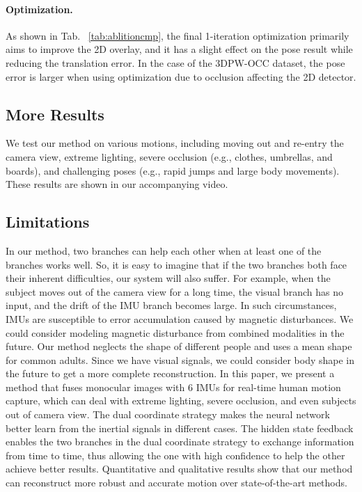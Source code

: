 \documentclass[sigconf,nonacm=true]{acmart}
\newcommand{\hl}[1]{{#1}}
\begin{document}
\paragraph{Optimization.}
As shown in Tab. ~\ref{tab:ablitioncmp}, the final 1-iteration optimization primarily aims to improve the 2D overlay, and it has a slight effect on the pose result while reducing the translation error.
\hl{In the case of the 3DPW-OCC dataset, the pose error is larger when using optimization due to occlusion affecting the 2D detector.}
\subsection{More Results}\label{sec:moreResults}
We test our method on various motions, including moving out and re-entry the camera view, extreme lighting, severe occlusion (e.g., clothes, umbrellas, and boards), and challenging poses (e.g., rapid jumps and large body movements). These results are shown in our accompanying video.

\subsection{Limitations}\label{sec:limitations}
In our method, two branches can help each other when at least one of the branches works well.
So, it is easy to imagine that if the two branches both face their inherent difficulties, our system will also suffer.
For example, when the subject moves out of the camera view for a long time, the visual branch has no input, and the drift of the IMU branch becomes large.
In such circumstances, IMUs are susceptible to error accumulation caused by magnetic disturbances.
We could consider modeling magnetic disturbance from combined modalities in the future.
Our method neglects the shape of different people and uses a mean shape for common adults.
Since we have visual signals, we could consider body shape in the future to get a more complete reconstruction.
In this paper, we present a method that fuses monocular images with 6 IMUs for real-time human motion capture, which can deal with extreme lighting, severe occlusion, and even subjects out of camera view.
The dual coordinate strategy makes the neural network better learn from the inertial signals in different cases.
The hidden state feedback enables the two branches in the dual coordinate strategy to exchange information from time to time, thus allowing the one with high confidence to help the other achieve better results. 
Quantitative and qualitative results show that our method can reconstruct more robust and accurate motion over state-of-the-art methods.
 
\end{document}
